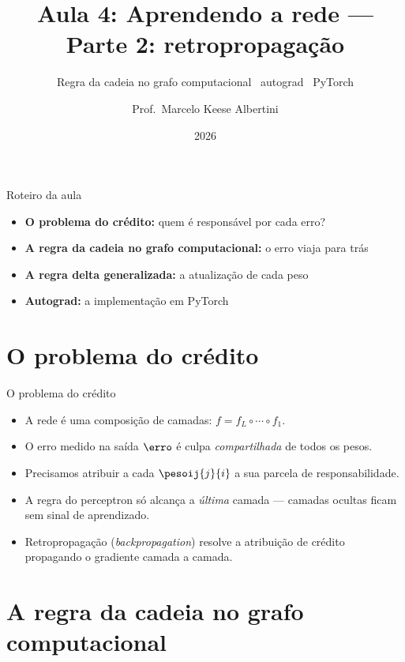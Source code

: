 \documentclass[aspectratio=169, 11pt]{beamer}
\title[Aula 4 — Retropropagação]{Aula 4: Aprendendo a rede — Parte 2: retropropagação}
\subtitle[GBC073 — Inteligência Computacional]{Regra da cadeia no grafo computacional \textbullet\ autograd \textbullet\ PyTorch}
\author[Prof.\ Marcelo Albertini]{Prof.\ Marcelo Keese Albertini}
\institute{GBC073 — Inteligência Computacional \textbullet\ Universidade Federal de Uberlândia}
\date{2026}
\begin{document}
\begin{frame}
  \titlepage
\end{frame}

\begin{frame}{Roteiro da aula}
  \begin{itemize}\setlength{\itemsep}{0.5ex}
    \item<1-> \textbf{O problema do crédito:} quem é responsável por cada erro?
    \item<2-> \textbf{A regra da cadeia no grafo computacional:} o erro viaja para trás
    \item<3-> \textbf{A regra delta generalizada:} a atualização de cada peso
    \item<4-> \textbf{Autograd:} a implementação em PyTorch
  \end{itemize}
\end{frame}

\section{O problema do crédito}

\begin{frame}{O problema do crédito}
  \begin{itemize}\setlength{\itemsep}{0.4ex}
    \item A rede é uma composição de camadas: $f = f_L \circ \cdots \circ f_1$.
    \item O erro medido na saída $\erro$ é culpa \emph{compartilhada} de todos os pesos.
    \item Precisamos atribuir a cada $\pesoij{j}{i}$ a sua parcela de responsabilidade.
    \item A regra do perceptron só alcança a \emph{última} camada — camadas ocultas
          ficam sem sinal de aprendizado.
    \item Retropropagação (\emph{backpropagation}) resolve a atribuição de crédito
          propagando o gradiente camada a camada.
  \end{itemize}
\end{frame}

\section{A regra da cadeia no grafo computacional}
\end{document}
